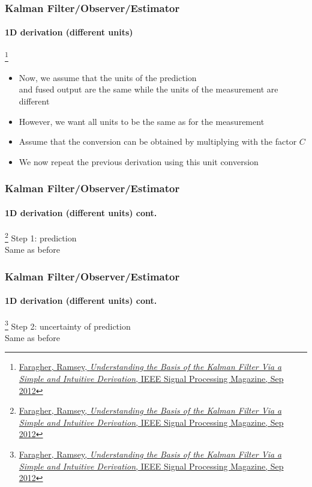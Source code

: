\documentclass{beamer}
\begin{document}
\begin{frame}
\frametitle{Kalman Filter/Observer/Estimator}
\framesubtitle{1D derivation (different units)}

\footnote{\tiny\hspace{-0.23in} \href{http://www.cl.cam.ac.uk/~rmf25/papers/Understanding the Basis of the Kalman Filter.pdf}{Faragher, Ramsey, \emph{Understanding the Basis of the Kalman Filter Via a Simple and Intuitive Derivation}, IEEE Signal Processing Magazine, Sep 2012}}
\scriptsize 
\begin{itemize}\scriptsize
\item Now, we assume that the units of the prediction \\and fused output are the same while the units of the measurement are different
\item However, we want all units to be the same as for the measurement
\item Assume that the conversion can be obtained by multiplying with the factor $C$
\item We now repeat the previous derivation using this unit conversion
\end{itemize}
\end{frame}



\begin{frame}
\frametitle{Kalman Filter/Observer/Estimator}
\framesubtitle{1D derivation (different units) \tiny cont.}

\footnote{\tiny\hspace{-0.23in} \href{http://www.cl.cam.ac.uk/~rmf25/papers/Understanding the Basis of the Kalman Filter.pdf}{Faragher, Ramsey, \emph{Understanding the Basis of the Kalman Filter Via a Simple and Intuitive Derivation}, IEEE Signal Processing Magazine, Sep 2012}}
\scriptsize 
Step 1: {\color{red}prediction}\\
Same as before
\end{frame}


\begin{frame}
\frametitle{Kalman Filter/Observer/Estimator}
\framesubtitle{1D derivation (different units) \tiny cont.}

\footnote{\tiny\hspace{-0.23in} \href{http://www.cl.cam.ac.uk/~rmf25/papers/Understanding the Basis of the Kalman Filter.pdf}{Faragher, Ramsey, \emph{Understanding the Basis of the Kalman Filter Via a Simple and Intuitive Derivation}, IEEE Signal Processing Magazine, Sep 2012}}
\scriptsize 
Step 2: {\color{red}uncertainty of prediction}\\
Same as before
\end{frame}
\end{document}

